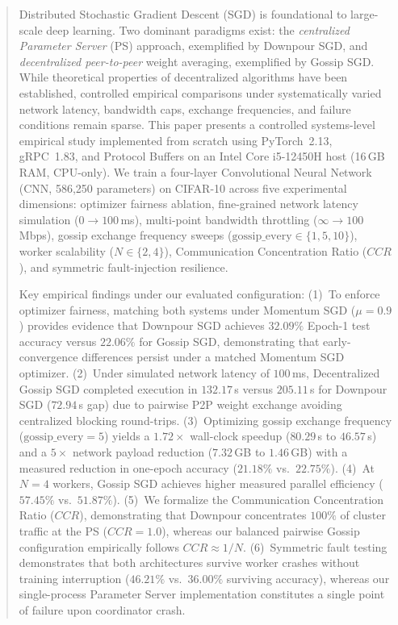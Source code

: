 \documentclass[conference]{IEEEtran}
\begin{document}
\begin{abstract}
Distributed Stochastic Gradient Descent (SGD) is foundational to large-scale deep learning. Two dominant paradigms exist: the \emph{centralized Parameter Server} (PS) approach, exemplified by Downpour SGD, and \emph{decentralized peer-to-peer} weight averaging, exemplified by Gossip SGD. While theoretical properties of decentralized algorithms have been established, controlled empirical comparisons under systematically varied network latency, bandwidth caps, exchange frequencies, and failure conditions remain sparse. This paper presents a controlled systems-level empirical study implemented from scratch using PyTorch~2.13, gRPC~1.83, and Protocol Buffers on an Intel Core i5-12450H host (16\,GB RAM, CPU-only). We train a four-layer Convolutional Neural Network (CNN, 586,250 parameters) on CIFAR-10 across five experimental dimensions: optimizer fairness ablation, fine-grained network latency simulation ($0\to 100$\,ms), multi-point bandwidth throttling ($\infty\to 100$\,Mbps), gossip exchange frequency sweeps ($\text{gossip\_every} \in \{1,5,10\}$), worker scalability ($N \in \{2,4\}$), Communication Concentration Ratio ($CCR$), and symmetric fault-injection resilience.

Key empirical findings under our evaluated configuration: (1)~To enforce optimizer fairness, matching both systems under Momentum SGD ($\mu=0.9$) provides evidence that Downpour SGD achieves $32.09\%$ Epoch-1 test accuracy versus $22.06\%$ for Gossip SGD, demonstrating that early-convergence differences persist under a matched Momentum SGD optimizer. (2)~Under simulated network latency of $100$\,ms, Decentralized Gossip SGD completed execution in $132.17$\,s versus $205.11$\,s for Downpour SGD ($72.94$\,s gap) due to pairwise P2P weight exchange avoiding centralized blocking round-trips. (3)~Optimizing gossip exchange frequency ($\text{gossip\_every}=5$) yields a $1.72\times$ wall-clock speedup ($80.29$\,s to $46.57$\,s) and a $5\times$ network payload reduction ($7.32$\,GB to $1.46$\,GB) with a measured reduction in one-epoch accuracy ($21.18\%$ vs.\ $22.75\%$). (4)~At $N=4$ workers, Gossip SGD achieves higher measured parallel efficiency ($57.45\%$ vs.\ $51.87\%$). (5)~We formalize the Communication Concentration Ratio ($CCR$), demonstrating that Downpour concentrates $100\%$ of cluster traffic at the PS ($CCR=1.0$), whereas our balanced pairwise Gossip configuration empirically follows $CCR \approx 1/N$. (6)~Symmetric fault testing demonstrates that both architectures survive worker crashes without training interruption ($46.21\%$ vs.\ $36.00\%$ surviving accuracy), whereas our single-process Parameter Server implementation constitutes a single point of failure upon coordinator crash.
\end{abstract}
\end{document}

